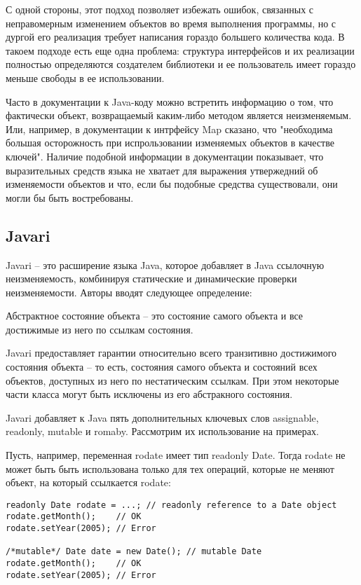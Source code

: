 С одной стороны, этот подход позволяет избежать ошибок, связанных с неправомерным изменением объектов во время выполнения программы, но с дургой его реализация требует написания гораздо большего количества кода. В такоем подходе есть еще одна проблема: структура интерфейсов и их реализации полностью определяются создателем библиотеки и ее пользователь имеет гораздо меньше свободы в ее использовании. 

Часто в документации к Java-коду можно встретить информацию о том, что фактически объект, возвращаемый каким-либо методом является неизменяемым. Или, например, в документации к интрфейсу Map сказано, что "необходима большая осторожность при испрользовании изменяемых объектов в качестве ключей". Наличие подобной информации в документации показывает, что выразительных средств языка не хватает для выражения утвержедний об изменяемости объектов и что, если бы подобные средства существовали, они могли бы быть востребованы.


\subsection{Javari}

Javari \cite{Tschantz2006} -- это расширение языка Java, которое добавляет в Java ссылочную неизменяемость, комбинируя статические и динамические проверки неизменяемости. Авторы вводят следующее определение:

\begin{Def}\label{abstract_state}
Абстрактное состояние объекта -- это состояние самого объекта и все достижимые из него по ссылкам состояния.
\end{Def}

Javari предоставляет гарантии относительно всего транзитивно достижимого состояния объекта -- то есть, состояния самого объекта и состояний всех объектов, доступных из него по нестатическим ссылкам. При этом некоторые части класса могут быть исключены из его абстракного состояния. 

Javari добавляет к Java пять дополнительных ключевых слов assignable, readonly, mutable и romaby. Рассмотрим их использование на примерах.

Пусть, например, переменная rodate имеет тип readonly Date. Тогда rodate не может быть быть использована только для тех операций, которые не меняют объект, на который ссылкается rodate:

\begin{lstlisting}[caption=Неизменяемая ссылка, label=code:readonly_ref]
readonly Date rodate = ...; // readonly reference to a Date object 
rodate.getMonth();    // OK
rodate.setYear(2005); // Error

/*mutable*/ Date date = new Date(); // mutable Date
rodate.getMonth();    // OK
rodate.setYear(2005); // Error
\end{lstlisting}

